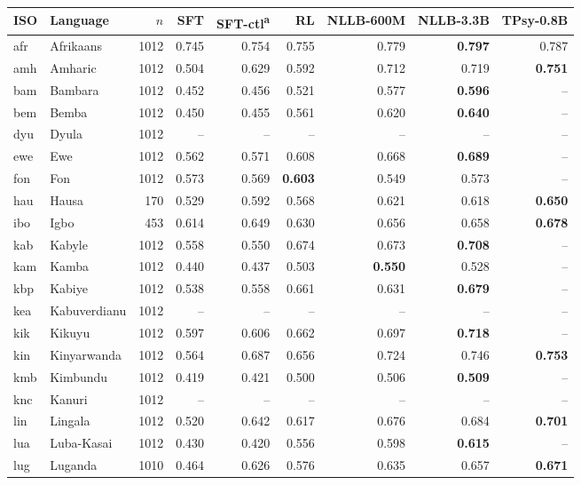 \begin{table}[t]
\centering\footnotesize
\setlength{\tabcolsep}{3pt}
\begin{tabular}{@{}llrrrrrrr@{}}
\toprule
ISO & Language & $n$ & SFT & SFT-ctl\textsuperscript{a} & RL & NLLB-600M & NLLB-3.3B & TPsy-0.8B \\
\midrule
afr & Afrikaans & 1012 & 0.745 & 0.754 & 0.755 & 0.779 & \textbf{0.797} & 0.787 \\
amh & Amharic & 1012 & 0.504 & 0.629 & 0.592 & 0.712 & 0.719 & \textbf{0.751} \\
bam & Bambara & 1012 & 0.452 & 0.456 & 0.521 & 0.577 & \textbf{0.596} & -- \\
bem & Bemba & 1012 & 0.450 & 0.455 & 0.561 & 0.620 & \textbf{0.640} & -- \\
dyu & Dyula & 1012 & -- & -- & -- & -- & -- & -- \\
ewe & Ewe & 1012 & 0.562 & 0.571 & 0.608 & 0.668 & \textbf{0.689} & -- \\
fon & Fon & 1012 & 0.573 & 0.569 & \textbf{0.603} & 0.549 & 0.573 & -- \\
hau & Hausa & 170 & 0.529 & 0.592 & 0.568 & 0.621 & 0.618 & \textbf{0.650} \\
ibo & Igbo & 453 & 0.614 & 0.649 & 0.630 & 0.656 & 0.658 & \textbf{0.678} \\
kab & Kabyle & 1012 & 0.558 & 0.550 & 0.674 & 0.673 & \textbf{0.708} & -- \\
kam & Kamba & 1012 & 0.440 & 0.437 & 0.503 & \textbf{0.550} & 0.528 & -- \\
kbp & Kabiye & 1012 & 0.538 & 0.558 & 0.661 & 0.631 & \textbf{0.679} & -- \\
kea & Kabuverdianu & 1012 & -- & -- & -- & -- & -- & -- \\
kik & Kikuyu & 1012 & 0.597 & 0.606 & 0.662 & 0.697 & \textbf{0.718} & -- \\
kin & Kinyarwanda & 1012 & 0.564 & 0.687 & 0.656 & 0.724 & 0.746 & \textbf{0.753} \\
kmb & Kimbundu & 1012 & 0.419 & 0.421 & 0.500 & 0.506 & \textbf{0.509} & -- \\
knc & Kanuri & 1012 & -- & -- & -- & -- & -- & -- \\
lin & Lingala & 1012 & 0.520 & 0.642 & 0.617 & 0.676 & 0.684 & \textbf{0.701} \\
lua & Luba-Kasai & 1012 & 0.430 & 0.420 & 0.556 & 0.598 & \textbf{0.615} & -- \\
lug & Luganda & 1010 & 0.464 & 0.626 & 0.576 & 0.635 & 0.657 & \textbf{0.671} \\

\end{tabular}
\end{table}

